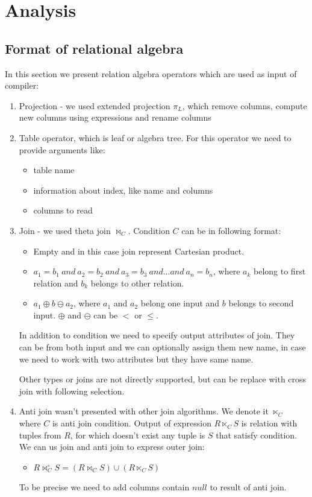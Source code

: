 \chapter{Analysis}

\section{Format of relational algebra}

In this section we present relation algebra operators which are used as input of compiler:
\begin{enumerate}
\item Projection - we used extended projection $\pi_L$, which remove columns, compute new columns using expressions and rename columns

\item Table operator, which is leaf or algebra tree. For this operator we need to provide arguments like:
\begin{itemize}
\item table name
\item information about index, like name and columns
\item columns to read
\end{itemize}
\item Join - we used theta join $\Join_C$. Condition $C$ can be in following format:
\begin{itemize}
\item Empty and in this case join represent Cartesian product.
\item $a_1=b_1~and~a_2=b_2~and~a_3=b_3~and...and~a_n=b_n$, where $a_k$ belong to first relation and $b_k$ belongs to other relation.
\item $a_1\oplus b \ominus a_2$, where $a_1$ and $a_2$ belong one input and $b$ belongs to second input. $\oplus$ and $\ominus$ can be $<$ or $\leq$.

\end{itemize}

In addition to condition we need to specify output attributes of join. They can be from both input and we can optionally assign them new name, in case we need to work with two attributes but they have same name.

Other types or joins are not directly supported, but can be replace with cross join with following selection.
\item Anti join wasn't presented with other join algorithms. We denote it $\ltimes_C$ where $C$ is anti join condition. Output of expression $R \ltimes_C S$ is relation with tuples from $R$, for which doesn't exist any tuple is $S$ that satisfy condition. We can us join and anti join to express outer join:
\begin{itemize}
\item 
 $R\Join^\circ_C S= (R\Join_C S)\cup (R\ltimes_C S)$
\end{itemize}
To be precise we need to add columns contain $null$ to result of anti join.
 

\end{enumerate}
